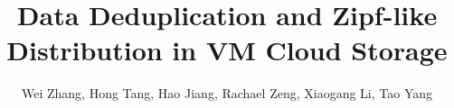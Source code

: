 \documentclass[finalversion]{usetex-v1}
\begin{document}
\title{Data Deduplication and Zipf-like Distribution in VM Cloud Storage}
\author{Wei Zhang, Hong Tang, Hao Jiang, Rachael Zeng, Xiaogang Li, Tao Yang}
\date{}
\maketitle



%
%



\end{document}
